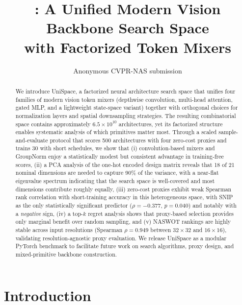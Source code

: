 \documentclass[10pt,twocolumn,letterpaper]{article}
\title{\method: A Unified Modern Vision Backbone Search Space\\with Factorized Token Mixers}
\author{Anonymous CVPR-NAS submission}
\newcommand{\method}{UniSpace\xspace}
\newcommand{\naswot}{NASWOT\xspace}
\begin{document}
\maketitle

\begin{abstract}
We introduce \method, a factorized neural architecture search space that unifies four families of modern vision token mixers (depthwise convolution, multi-head attention, gated MLP, and a lightweight state-space variant) together with orthogonal choices for normalization layers and spatial downsampling strategies.
The resulting combinatorial space contains approximately $6.5 \times 10^{10}$ architectures, yet its factorized structure enables systematic analysis of which primitives matter most.
Through a scaled sample-and-evaluate protocol that scores 500 architectures with four zero-cost proxies and trains 30 with short schedules, we show that (i) convolution-based mixers and GroupNorm enjoy a statistically modest but consistent advantage in training-free scores, (ii) a PCA analysis of the one-hot encoded design matrix reveals that 18 of 21 nominal dimensions are needed to capture 90\% of the variance, with a near-flat eigenvalue spectrum indicating that the search space is well-covered and most dimensions contribute roughly equally, (iii) zero-cost proxies exhibit weak Spearman rank correlation with short-training accuracy in this heterogeneous space, with SNIP as the only statistically significant predictor ($\rho = -0.377$, $p = 0.040$) and notably with a \emph{negative} sign, (iv) a top-$k$ regret analysis shows that proxy-based selection provides only marginal benefit over random sampling, and (v) \naswot rankings are highly stable across input resolutions (Spearman $\rho = 0.949$ between $32 \times 32$ and $16 \times 16$), validating resolution-agnostic proxy evaluation.
We release \method as a modular PyTorch benchmark to facilitate future work on search algorithms, proxy design, and mixed-primitive backbone construction.
\end{abstract}

\section{Introduction}
\label{sec:intro}
\end{document}
